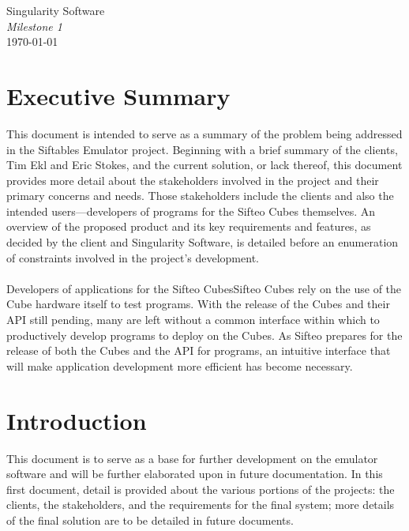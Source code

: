 \documentclass[12pt]{article}
\begin{document}
\vspace*{\fill}
        \begin{center}
                \LARGE{Singularity Software} \\
                \LARGE{\textit{Milestone 1}} \\
                \vspace{.15in}
                \large{\today} \\
        \end{center}
\vspace*{\fill}

\clearpage

\tableofcontents

\clearpage
        
\section{Executive Summary}
This document is intended to serve as a summary of the problem being addressed in the Siftables Emulator project.  Beginning with a brief summary of the clients, Tim Ekl and Eric Stokes, and the current solution, or lack thereof, this document provides more detail about the stakeholders involved in the project and their primary concerns and needs.  Those stakeholders include the clients and also the intended users---developers of programs for the Sifteo Cubes themselves.  An overview of the proposed product and its key requirements and features, as decided by the client and Singularity Software, is detailed before an enumeration of constraints involved in the project's development. \\\\
Developers of applications for the Sifteo Cubes\gls{Sifteo Cubes} rely on the use of the Cube hardware itself to test programs.  With the release of the Cubes and their API still pending, many are left without a common interface within which to productively develop programs to deploy on the Cubes.  As Sifteo prepares for the release of both the Cubes and the API for programs, an intuitive interface that will make application development more efficient has become necessary.

\section{Introduction}
This document is to serve as a base for further development on the emulator software and will be further elaborated upon in future documentation.  In this first document, detail is provided about the various portions of the projects: the clients, the stakeholders, and the requirements for the final system; more details of the final solution are to be detailed in future documents.
\end{document}
